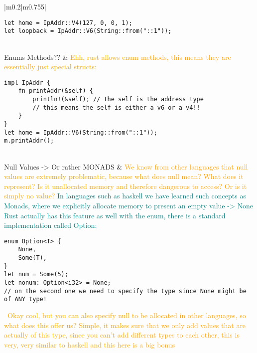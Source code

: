 \documentclass[main.tex,fontsize=8pt,paper=a4,paper=portrait,DIV=calc,]{scrartcl}
\begin{document}
\begin{table}[ht!]
\begin{tabular}{|m{0.2\linewidth}|m{0.755\linewidth}|}
\begin{lstlisting}
let home = IpAddr::V4(127, 0, 0, 1);
let loopback = IpAddr::V6(String::from("::1"));
\end{lstlisting}\\
\hline
Enums Methods?? & 
\textcolor{orange}{Ehh, rust allows enum methods, this means they are essentially just special structs:}\newline
\begin{lstlisting}
impl IpAddr {
    fn printAddr(&self) {
        println!(&self); // the self is the address type
        // this means the self is either a v6 or a v4!!
    }
}
let home = IpAddr::V6(String::from("::1"));
m.printAddr();
\end{lstlisting}\\
\hline
Null Values -> Or rather MONADS &
\textcolor{orange}{We know from other languages that null values are extremely problematic, because what does null mean? What does it represent? Is it unallocated memory and therefore dangerous to access?\newline
Or is it simply no value?}\newline
\textcolor{teal}{In languages such as haskell we have learned such concepts as Monads, where we explicitly allocate memory to present an empty value -> None\newline
Rust actually has this feature as well with the enum, there is a standard implementation called Option:}\newline
\begin{lstlisting}
enum Option<T> {
    None,
    Some(T),
}
let num = Some(5);
let nonum: Option<i32> = None;
// on the second one we need to specify the type since None might be of ANY type!
\end{lstlisting}
\, \newline
\textcolor{orange}{Okay cool, but you can also specify null to be allocated in other languages, so what does this offer us? \newline
Simple, it makes sure that we only add values that are actually of this type, since you can't add different types to each other, this is very, very similar to haskell and this here is a big bonus}\\
\hline
\end{tabular}
\end{table}
\pagebreak
\end{document}

